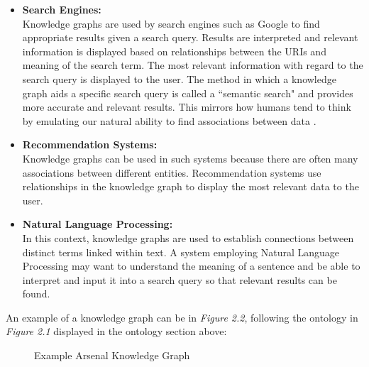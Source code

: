 \vspace{-0.1cm}
\begin{itemize}
\itemsep0em 
\item \textbf{Search Engines:} \\Knowledge graphs are used by search engines such as Google to find appropriate results given a search query. Results are interpreted and relevant information is displayed based on relationships between the URIs and meaning of the search term. The most relevant information with regard to the search query is displayed to the user. The method in which a knowledge graph aids a specific search query is called a ``semantic search" and provides more accurate and relevant results. This mirrors how humans tend to think by emulating our natural ability to find associations between data \cite{searchengine}.  

\item \textbf{Recommendation Systems:} \\Knowledge graphs can be used in such systems because there are often many associations between different entities. Recommendation systems use relationships in the knowledge graph to display the most relevant data to the user. 

\item \textbf{Natural Language Processing:}\\ In this context, knowledge graphs are used to establish connections between distinct terms linked within text. A system employing Natural Language Processing may want to understand the meaning of a sentence and be able to interpret and input it into a search query so that relevant results can be found. 
\end{itemize}

An example of a knowledge graph can be in \textit{Figure 2.2}, following the ontology in \textit{Figure 2.1} displayed in the ontology section above:

\begin{figure}[H]
\begin{center}
\end{center}
\vspace{-0.4cm}
\caption{Example Arsenal Knowledge Graph}
\end{figure}
\vspace{-0.1cm}

